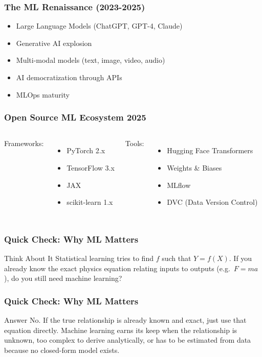 \begin{frame}[fragile]\frametitle{The ML Renaissance (2023-2025)}
\begin{itemize}
\item Large Language Models (ChatGPT, GPT-4, Claude)
\item Generative AI explosion
\item Multi-modal models (text, image, video, audio)
\item AI democratization through APIs
\item MLOps maturity
\end{itemize}
\end{frame}

\begin{frame}[fragile]\frametitle{Open Source ML Ecosystem 2025}
\begin{columns}
Frameworks:
\begin{itemize}
\item PyTorch 2.x
\item TensorFlow 3.x
\item JAX
\item scikit-learn 1.x
\end{itemize}

Tools:
\begin{itemize}
\item Hugging Face Transformers
\item Weights \& Biases
\item MLflow
\item DVC (Data Version Control)
\end{itemize}
\end{columns}
\end{frame}

\begin{frame}[fragile]\frametitle{Quick Check: Why ML Matters}
\begin{block}{Think About It}
Statistical learning tries to find $f$ such that $Y = f(X)$. If you already know the exact physics equation relating inputs to outputs (e.g.\ $F = ma$), do you still need machine learning?
\end{block}
\end{frame}

\begin{frame}[fragile]\frametitle{Quick Check: Why ML Matters}
\begin{block}{Answer}
No. If the true relationship is already known and exact, just use that equation directly. Machine learning earns its keep when the relationship is unknown, too complex to derive analytically, or has to be estimated from data because no closed-form model exists.
\end{block}
\end{frame}


